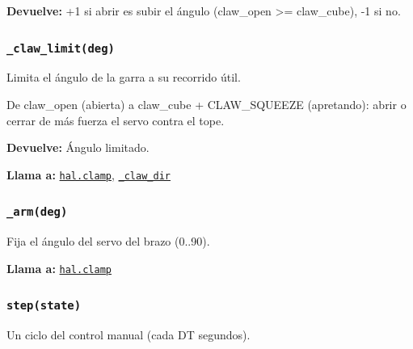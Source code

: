 \noindent\textbf{Devuelve:} +1 si abrir es subir el ángulo (claw\_open >= claw\_cube), -1 si no.\par

\subsubsection{\texttt{\_\allowbreak{}claw\_\allowbreak{}limit(deg)}}\label{fn:manual:-claw-limit}
\noindent Limita el ángulo de la garra a su recorrido útil.

De claw\_open (abierta) a claw\_cube + CLAW\_SQUEEZE (apretando): abrir o cerrar de más fuerza el servo contra el tope.

\par{}\par\smallskip
\noindent\textbf{Devuelve:} Ángulo limitado.\par
\noindent\textbf{Llama a:} \hyperref[fn:hal:clamp]{\texttt{hal.clamp}}, \hyperref[fn:manual:-claw-dir]{\texttt{\_\allowbreak{}claw\_\allowbreak{}dir}}\par

\subsubsection{\texttt{\_\allowbreak{}arm(deg)}}\label{fn:manual:-arm}
\noindent Fija el ángulo del servo del brazo (0..90\textdegree{}).

\par{}\par\smallskip
\noindent\textbf{Llama a:} \hyperref[fn:hal:clamp]{\texttt{hal.clamp}}\par

\subsubsection{\texttt{step(state)}}\label{fn:manual:step}
\noindent Un ciclo del control manual (cada DT segundos).


